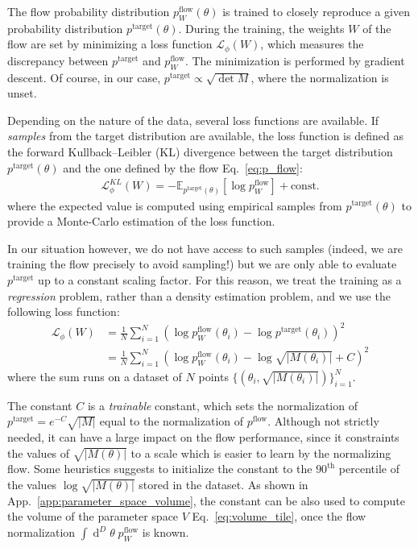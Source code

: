 \documentclass[twocolumn,showpacs,preprintnumbers,nofootinbib,prd,
superscriptaddress,10pt]{revtex4-2}
\newcommand{\dvol}[2]{\ensuremath{\operatorname{d}^{#2}\!{#1}}}
\begin{document}
The flow probability distribution $p^\text{flow}_W(\theta)$ is trained to closely reproduce a given probability distribution $p^\text{target}(\theta)$.
During the training, the weights $W$ of the flow are set by minimizing a loss function $\mathcal{L}_\phi(W)$, which measures the discrepancy between $p^\text{target}$ and $p^\text{flow}_W$. The minimization is performed by gradient descent.
Of course, in our case, $p^\text{target} \propto \sqrt{\det M}$, where the normalization is unset.

Depending on the nature of the data, several loss functions are available.
If {\it samples} from the target distribution are available, the loss function is defined as the forward Kullback–Leibler (KL) divergence between the target distribution $p^\text{target}(\theta)$ and the one defined by the flow Eq.~\eqref{eq:p_flow}:
\begin{align}
	\mathcal{L}^{KL}_\phi(W) = - \mathbb{E}_{p^\text{target}(\theta)} [\log p^\text{flow}_W] + \text{const.}
\end{align}
where the expected value is computed using empirical samples from $p^\text{target}(\theta)$ to provide a Monte-Carlo estimation of the loss function.

In our situation however, we do not have access to such samples (indeed, we are training the flow precisely to avoid sampling!) but we are only able to evaluate $p^\text{target}$ up to a constant scaling factor.
For this reason, we treat the training as a {\it regression} problem, rather than a density estimation problem, and we use the following loss function:
%
\begin{align}\label{eq:loss_mse}
	\mathcal{L}_\phi(W) &= \frac{1}{N} \sum_{i=1}^N \left(\log p^\text{flow}_W(\theta_i) - \log p^\text{target}(\theta_i) \right)^2 \nonumber\\
						&= \frac{1}{N} \sum_{i=1}^N \left(\log p^\text{flow}_W(\theta_i) - \log\sqrt{|M(\theta_i)|} + C \right)^2
\end{align}
%
where the sum runs on a dataset of $N$ points $\{(\theta_i, \sqrt{|M(\theta_i)|})\}_{i=1}^N$.

The constant $C$ is a {\it trainable} constant, which sets the normalization of $p^\text{target} = e^{-C} \sqrt{|M|}$ equal to the normalization of $p^\text{flow}$.
Although not strictly needed, it can have a large impact on the flow performance, since it constraints the values of $\sqrt{|M(\theta)|}$ to a scale which is easier to learn by the normalizing flow.
Some heuristics suggests to initialize the constant to the $90^\text{th}$ percentile of the values $\log \sqrt{|M(\theta)|}$ stored in the dataset.
As shown in App.~\ref{app:parameter_space_volume}, the constant can be also used to compute the volume of the parameter space $V$ Eq.~\eqref{eq:volume_tile}, once the flow normalization $\int \dvol{\theta}{D} \; p^\text{flow}_W$ is known.
\end{document}
